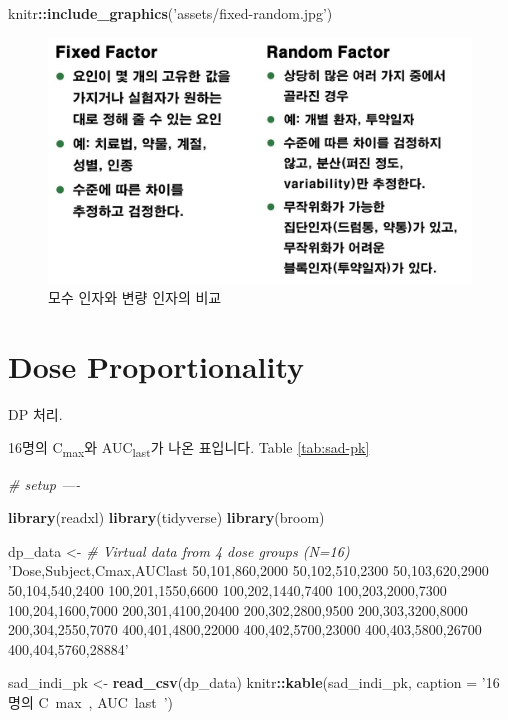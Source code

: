 \documentclass[12pt,]{krantz}
\newenvironment{Shaded}{\begin{snugshade}}{\end{snugshade}}
\newcommand{\CommentTok}[1]{\textcolor[rgb]{0.56,0.35,0.01}{\textit{#1}}}
\newcommand{\DataTypeTok}[1]{\textcolor[rgb]{0.13,0.29,0.53}{#1}}
\newcommand{\KeywordTok}[1]{\textcolor[rgb]{0.13,0.29,0.53}{\textbf{#1}}}
\newcommand{\NormalTok}[1]{#1}
\newcommand{\OperatorTok}[1]{\textcolor[rgb]{0.81,0.36,0.00}{\textbf{#1}}}
\newcommand{\StringTok}[1]{\textcolor[rgb]{0.31,0.60,0.02}{#1}}
\begin{document}
\begin{Shaded}
\begin{Highlighting}[]
\NormalTok{knitr}\OperatorTok{::}\KeywordTok{include_graphics}\NormalTok{(}\StringTok{'assets/fixed-random.jpg'}\NormalTok{)}
\end{Highlighting}
\end{Shaded}

\begin{figure}
\includegraphics[width=1\linewidth]{assets/fixed-random} \caption{모수 인자와 변량 인자의 비교}\label{fig:fixedrandom}
\end{figure}

\hypertarget{dp}{%
\section{Dose Proportionality}\label{dp}}

DP 처리.

16명의 C\textsubscript{max}와 AUC\textsubscript{last}가 나온 표입니다. Table \ref{tab:sad-pk}

\begin{Shaded}
\begin{Highlighting}[]
\CommentTok{# setup ----}

\KeywordTok{library}\NormalTok{(readxl)}
\KeywordTok{library}\NormalTok{(tidyverse)}
\KeywordTok{library}\NormalTok{(broom)}

\NormalTok{dp_data <-}\StringTok{ }\CommentTok{# Virtual data from 4 dose groups (N=16)}
\StringTok{'Dose,Subject,Cmax,AUClast}
\StringTok{50,101,860,2000}
\StringTok{50,102,510,2300}
\StringTok{50,103,620,2900}
\StringTok{50,104,540,2400}
\StringTok{100,201,1550,6600}
\StringTok{100,202,1440,7400}
\StringTok{100,203,2000,7300}
\StringTok{100,204,1600,7000}
\StringTok{200,301,4100,20400}
\StringTok{200,302,2800,9500}
\StringTok{200,303,3200,8000}
\StringTok{200,304,2550,7070}
\StringTok{400,401,4800,22000}
\StringTok{400,402,5700,23000}
\StringTok{400,403,5800,26700}
\StringTok{400,404,5760,28884'}

\NormalTok{sad_indi_pk <-}\StringTok{ }\KeywordTok{read_csv}\NormalTok{(dp_data)}
\NormalTok{knitr}\OperatorTok{::}\KeywordTok{kable}\NormalTok{(sad_indi_pk, }\DataTypeTok{caption =} \StringTok{'16명의 C~max~, AUC~last~'}\NormalTok{)}
\end{Highlighting}
\end{Shaded}
\end{document}
